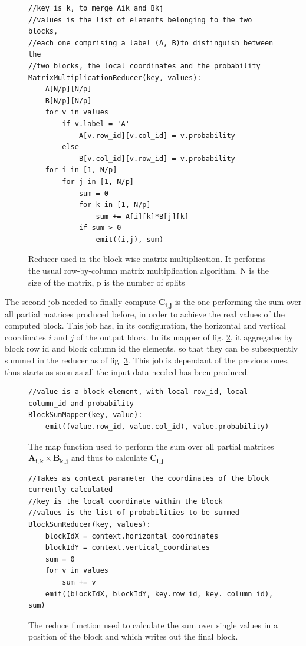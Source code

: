 \begin{figure}[H]
\begin{verbatim}
//key is k, to merge Aik and Bkj
//values is the list of elements belonging to the two blocks, 
//each one comprising a label (A, B)to distinguish between the 
//two blocks, the local coordinates and the probability 
MatrixMultiplicationReducer(key, values):
    A[N/p][N/p]
    B[N/p][N/p]
    for v in values
        if v.label = 'A'
            A[v.row_id][v.col_id] = v.probability
        else
            B[v.col_id][v.row_id] = v.probability
    for i in [1, N/p]
        for j in [1, N/p]
            sum = 0
            for k in [1, N/p]
                sum += A[i][k]*B[j][k]
            if sum > 0
                emit((i,j), sum)
\end{verbatim}
\caption{Reducer used in the block-wise matrix multiplication. It performs the usual row-by-column matrix multiplication algorithm. N is the size of the matrix, p is the number of splits}
\label{fig:blockwisereduce}
\end{figure}
The second job needed to finally compute $\mathbf{C_{i,j}}$ is the one performing the sum over all partial matrices produced before, in order to achieve the real values of the computed block.
This job has, in its configuration, the horizontal and vertical coordinates $i$ and $j$ of the output block. In its mapper of fig. \ref{fig:blocksummap}, it aggregates by block row id and block column id the elements, so that they can be subsequently summed in the reducer as of fig. \ref{fig:blocksumreduce}.
This job is dependant of the previous ones, thus starts as soon as all the input data needed has been produced.
\begin{figure}[H]
\begin{verbatim}
//value is a block element, with local row_id, local column_id and probability 
BlockSumMapper(key, value):
    emit((value.row_id, value.col_id), value.probability)
\end{verbatim}
\caption{The map function used to perform the sum over all partial matrices $\mathbf{A_{i,k}} \times \mathbf{B_{k,j}}$ and thus to calculate $\mathbf{C_{i,j}}$}
\label{fig:blocksummap}
\end{figure}
\begin{figure}[H]
\begin{verbatim}
//Takes as context parameter the coordinates of the block currently calculated
//key is the local coordinate within the block
//values is the list of probabilities to be summed
BlockSumReducer(key, values):
    blockIdX = context.horizontal_coordinates
    blockIdY = context.vertical_coordinates
    sum = 0
    for v in values
        sum += v
    emit((blockIdX, blockIdY, key.row_id, key._column_id), sum)
\end{verbatim}
\caption{The reduce function used to calculate the sum over single values in a position of the block and which writes out the final block.}
\label{fig:blocksumreduce}
\end{figure}

